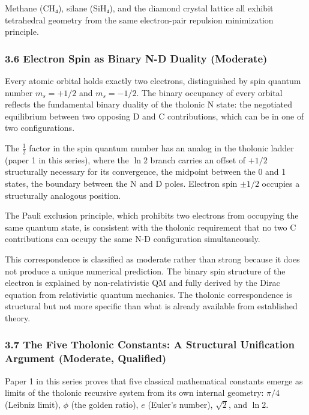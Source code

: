 \documentclass[
  11pt,
  letterpaper,
]{article}
\begin{document}
Methane (CH₄), silane (SiH₄), and the diamond crystal lattice all
exhibit tetrahedral geometry from the same electron-pair repulsion
minimization principle.

\subsubsection{3.6 Electron Spin as Binary N-D Duality
(Moderate)}\label{electron-spin-as-binary-n-d-duality-moderate}

Every atomic orbital holds exactly two electrons, distinguished by spin
quantum number \(m_s = +1/2\) and \(m_s = -1/2\). The binary occupancy
of every orbital reflects the fundamental binary duality of the tholonic
N state: the negotiated equilibrium between two opposing D and C
contributions, which can be in one of two configurations.

The \(\tfrac{1}{2}\) factor in the spin quantum number has an analog in
the tholonic ladder (paper 1 in this series), where the \(\ln 2\) branch
carries an offset of \(+1/2\) structurally necessary for its
convergence, the midpoint between the 0 and 1 states, the boundary
between the N and D poles. Electron spin \(\pm 1/2\) occupies a
structurally analogous position.

The Pauli exclusion principle, which prohibits two electrons from
occupying the same quantum state, is consistent with the tholonic
requirement that no two C contributions can occupy the same N-D
configuration simultaneously.

This correspondence is classified as moderate rather than strong because
it does not produce a unique numerical prediction. The binary spin
structure of the electron is explained by non-relativistic QM and fully
derived by the Dirac equation from relativistic quantum mechanics. The
tholonic correspondence is structural but not more specific than what is
already available from established theory.

\subsubsection{3.7 The Five Tholonic Constants: A Structural Unification
Argument (Moderate,
Qualified)}\label{the-five-tholonic-constants-a-structural-unification-argument-moderate-qualified}

Paper 1 in this series proves that five classical mathematical constants
emerge as limits of the tholonic recursive system from its own internal
geometry: \(\pi/4\) (Leibniz limit), \(\phi\) (the golden ratio), \(e\)
(Euler's number), \(\sqrt{2}\), and \(\ln 2\).
\end{document}
